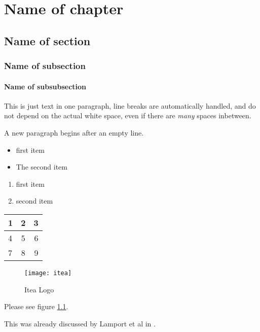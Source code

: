 \documentclass{template/openetcs_report}
\begin{document}





\chapter{Name of chapter}
\section{Name of section}
\subsection{Name of subsection}
\subsubsection{Name of subsubsection}

This is just text in one paragraph, line breaks are automatically handled, and do not depend on the actual
white
space, even if there are \emph{many}                                  spaces                            inbetween.

A new paragraph begins after an empty line.

\begin{itemize}
  \item first item
  \item The second item
\end{itemize}

\begin{enumerate}
  \item first item
  \item second item
\end{enumerate}

  \begin{tabular}{|  l | c || r | }
    \hline
    1 & 2 & 3 \\ \hline
    4 & 5 & 6 \\ \hline
    7 & 8 & 9 \\
    \hline
  \end{tabular}

\begin{figure}
  \centering
  \texttt{[image: itea]}
  \caption{Itea Logo}
  \label{fig:itea2}
\end{figure}

Please see figure \ref{fig:itea2}.

This was already discussed by Lamport et al in \cite{lamport94}.
\end{document}
